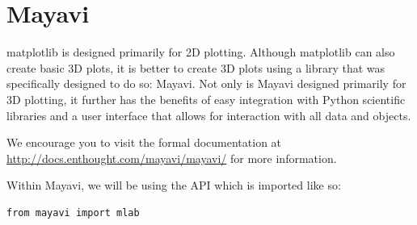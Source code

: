\section*{Mayavi}

matplotlib is designed primarily for 2D plotting.
Although matplotlib can also create basic 3D plots, it is better to create 3D plots using a library that was specifically designed to do so: Mayavi.
Not only is Mayavi designed primarily for 3D plotting, it further has the benefits of easy integration with Python scientific libraries and a user interface that allows for interaction with all data and objects.

We encourage you to visit the formal documentation at \url{http://docs.enthought.com/mayavi/mayavi/} for more information.

Within Mayavi, we will be using the  API which is imported like so:
\begin{lstlisting}
from mayavi import mlab
\end{lstlisting}

